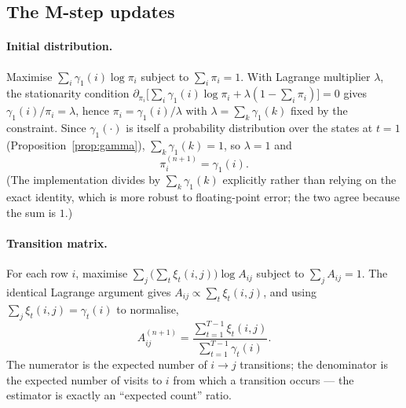 \documentclass[11pt]{article}
\theoremstyle{plain}
\theoremstyle{definition}
\theoremstyle{remark}
\begin{document}
\subsection{The M-step updates}

\paragraph{Initial distribution.}
Maximise $\sum_i\gamma_1(i)\log\pi_i$ subject to $\sum_i\pi_i=1$. With Lagrange
multiplier $\lambda$, the stationarity condition
$\partial_{\pi_i}\!\big[\sum_i\gamma_1(i)\log\pi_i+\lambda(1-\sum_i\pi_i)\big]=0$
gives $\gamma_1(i)/\pi_i=\lambda$, hence $\pi_i=\gamma_1(i)/\lambda$ with
$\lambda=\sum_k\gamma_1(k)$ fixed by the constraint. Since $\gamma_1(\cdot)$ is
itself a probability distribution over the states at $t=1$ (Proposition~\ref{prop:gamma}),
$\sum_k\gamma_1(k)=1$, so $\lambda=1$ and
\begin{equation}\label{eq:mstep-pi}
  \boxed{\;\pi_i^{(n+1)} = \gamma_1(i).\;}
\end{equation}
(The implementation divides by $\sum_k\gamma_1(k)$ explicitly rather than
relying on the exact identity, which is more robust to floating-point error;
the two agree because the sum is $1$.)

\paragraph{Transition matrix.}
For each row $i$, maximise $\sum_j\big(\sum_t\xi_t(i,j)\big)\log A_{ij}$ subject to
$\sum_j A_{ij}=1$. The identical Lagrange argument gives
$A_{ij}\propto\sum_t\xi_t(i,j)$, and using $\sum_j\xi_t(i,j)=\gamma_t(i)$ to
normalise,
\begin{equation}\label{eq:mstep-A}
  \boxed{\;A_{ij}^{(n+1)}
  = \frac{\sum_{t=1}^{T-1}\xi_t(i,j)}{\sum_{t=1}^{T-1}\gamma_t(i)}.\;}
\end{equation}
The numerator is the expected number of $i\!\to\!j$ transitions; the denominator
is the expected number of visits to $i$ from which a transition occurs --- the
estimator is exactly an ``expected count'' ratio.
\end{document}

